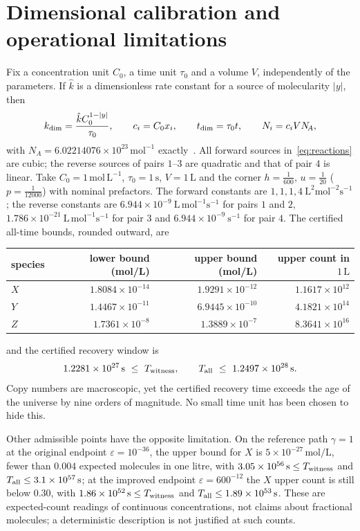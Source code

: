 \documentclass[11pt,a4paper]{article}
\theoremstyle{plain}
\theoremstyle{definition}
\theoremstyle{remark}
\newcommand{\eps}{\varepsilon}
\begin{document}
\section{Dimensional calibration and operational limitations}
\label{sec:examples}
Fix a concentration unit $C_0$, a time unit $\tau_0$ and a volume $V$, independently of the parameters. If $\hat k$ is a dimensionless rate constant for a source of molecularity $|y|$, then
\begin{equation}\label{eq:dimensional}
 k_{\rm dim}=\frac{\hat kC_0^{1-|y|}}{\tau_0},\qquad c_i=C_0x_i,\qquad t_{\rm dim}=\tau_0t,\qquad N_i=c_iVN_{\!A},
\end{equation}
with $N_{\!A}=6.02214076\times10^{23}\,\mathrm{mol^{-1}}$ exactly~\cite{BIPM2019}. All forward sources in~\eqref{eq:reactions} are cubic; the reverse sources of pairs $1$--$3$ are quadratic and that of pair $4$ is linear. Take $C_0=1\,\mathrm{mol\,L^{-1}}$, $\tau_0=1\,\mathrm s$, $V=1\,\mathrm L$ and the corner $h=\tfrac1{600}$, $u=\tfrac1{20}$ ($p=\tfrac1{12000}$) with nominal prefactors. The forward constants are $1,1,1,4\ \mathrm{L^2mol^{-2}s^{-1}}$; the reverse constants are $6.944\times10^{-9}\ \mathrm{L\,mol^{-1}s^{-1}}$ for pairs $1$ and $2$, $1.786\times10^{-21}\ \mathrm{L\,mol^{-1}s^{-1}}$ for pair $3$ and $6.944\times10^{-9}\ \mathrm{s^{-1}}$ for pair $4$. The certified all-time bounds, rounded outward, are
\begin{center}
\begin{tabular}{lrrr}
\toprule
species & lower bound (mol/L) & upper bound (mol/L) & upper count in $1\,\mathrm L$\\
\midrule
$X$ & $1.8084\times10^{-14}$ & $1.9291\times10^{-12}$ & $1.1617\times10^{12}$\\
$Y$ & $1.4467\times10^{-11}$ & $6.9445\times10^{-10}$ & $4.1821\times10^{14}$\\
$Z$ & $1.7361\times10^{-8}$ & $1.3889\times10^{-7}$ & $8.3641\times10^{16}$\\
\bottomrule
\end{tabular}
\end{center}
and the certified recovery window is
\[
 1.2281\times10^{27}\,\mathrm s\ \le\ T_{\rm witness},\qquad T_{\rm all}\ \le\ 1.2497\times10^{28}\,\mathrm s .
\]
Copy numbers are macroscopic, yet the certified recovery time exceeds the age of the universe by nine orders of magnitude. No small time unit has been chosen to hide this.

Other admissible points have the opposite limitation. On the reference path $\gamma=1$ at the original endpoint $\eps=10^{-36}$, the upper bound for $X$ is $5\times10^{-27}\,\mathrm{mol/L}$, fewer than $0.004$ expected molecules in one litre, with $3.05\times10^{56}\,\mathrm s\le T_{\rm witness}$ and $T_{\rm all}\le3.1\times10^{57}\,\mathrm s$; at the improved endpoint $\eps=600^{-12}$ the $X$ upper count is still below $0.30$, with $1.86\times10^{52}\,\mathrm s\le T_{\rm witness}$ and $T_{\rm all}\le1.89\times10^{53}\,\mathrm s$. These are expected-count readings of continuous concentrations, not claims about fractional molecules; a deterministic description is not justified at such counts.
\end{document}
